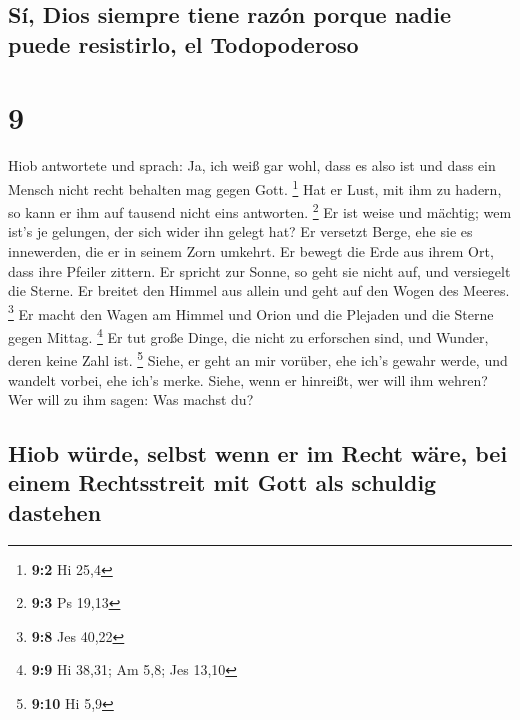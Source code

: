 \hypertarget{suxed-dios-siempre-tiene-razuxf3n-porque-nadie-puede-resistirlo-el-todopoderoso}{%
\subsection{Sí, Dios siempre tiene razón porque nadie puede resistirlo,
el
Todopoderoso}\label{suxed-dios-siempre-tiene-razuxf3n-porque-nadie-puede-resistirlo-el-todopoderoso}}

\hypertarget{section-8}{%
\section{9}\label{section-8}}

 Hiob antwortete und sprach:  Ja, ich weiß
gar wohl, dass es also ist und dass ein Mensch nicht recht behalten mag
gegen Gott. \footnote{\textbf{9:2} Hi 25,4}  Hat er Lust,
mit ihm zu hadern, so kann er ihm auf tausend nicht eins antworten.
\footnote{\textbf{9:3} Ps 19,13}  Er ist weise und
mächtig; wem ist's je gelungen, der sich wider ihn gelegt hat?
 Er versetzt Berge, ehe sie es innewerden, die er in
seinem Zorn umkehrt.  Er bewegt die Erde aus ihrem Ort,
dass ihre Pfeiler zittern.  Er spricht zur Sonne, so geht
sie nicht auf, und versiegelt die Sterne.  Er breitet den
Himmel aus allein und geht auf den Wogen des Meeres. \footnote{\textbf{9:8}
  Jes 40,22}  Er macht den Wagen am Himmel und Orion und
die Plejaden und die Sterne gegen Mittag. \footnote{\textbf{9:9} Hi
  38,31; Am 5,8; Jes 13,10}  Er tut große Dinge, die
nicht zu erforschen sind, und Wunder, deren keine Zahl ist. \footnote{\textbf{9:10}
  Hi 5,9}  Siehe, er geht an mir vorüber, ehe ich's
gewahr werde, und wandelt vorbei, ehe ich's merke. 
Siehe, wenn er hinreißt, wer will ihm wehren? Wer will zu ihm sagen: Was
machst du?

\hypertarget{hiob-wuxfcrde-selbst-wenn-er-im-recht-wuxe4re-bei-einem-rechtsstreit-mit-gott-als-schuldig-dastehen}{%
\subsection{Hiob würde, selbst wenn er im Recht wäre, bei einem
Rechtsstreit mit Gott als schuldig
dastehen}\label{hiob-wuxfcrde-selbst-wenn-er-im-recht-wuxe4re-bei-einem-rechtsstreit-mit-gott-als-schuldig-dastehen}}

